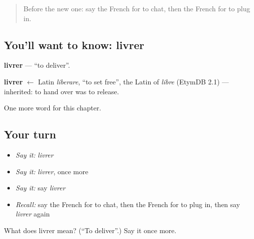 \begin{quote}
Before the new one: say the French for to chat, then the French for to plug in.
\end{quote}

\subsection*{You'll want to know: livrer}
\textbf{livrer} — \textquotedblleft{}to deliver\textquotedblright{}.

\begin{cousinweb}
\textbf{livrer} $\leftarrow$ Latin \emph{liberare}, \textquotedblleft{}to set free\textquotedblright{}, the Latin of \emph{libre} (EtymDB 2.1) — inherited: to hand over was to release.
\end{cousinweb}

\begin{grammarlens}[title={What you've built}]
One more word for this chapter.
\end{grammarlens}

\subsection*{Your turn}
\begin{itemize}
\raggedright
  \item \emph{Say it:} \emph{livrer}
  \item \emph{Say it:} \emph{livrer}, once more
  \item \emph{Say it:} say \emph{livrer}
  \item \emph{Recall:} say the French for to chat, then the French for to plug in, then say \emph{livrer} again
\end{itemize}

\begin{tcolorbox}[breakable,colback=teal!4,colframe=teal!35!black,title={Before you move on}]
What does livrer mean? (\textquotedblleft{}To deliver\textquotedblright{}.) Say it once more.
\end{tcolorbox}
